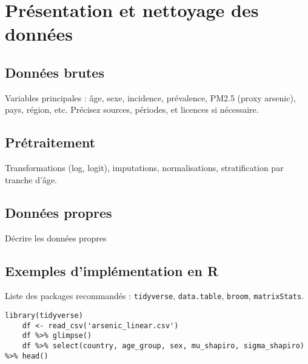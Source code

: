 \chapter{Présentation et nettoyage des données}
\label{chap:data}

\section{Données brutes}
Variables principales : âge, sexe, incidence, prévalence, PM2.5 (proxy arsenic), pays, région, etc. Précisez sources, périodes, et licences si nécessaire.


\section{Prétraitement}
Transformations (log, logit), imputations, normalisations, stratification par tranche d'âge.


\section{Données propres}
Décrire les données propres

\section{Exemples d'implémentation en R}
Liste des packages recommandés : \texttt{tidyverse}, \texttt{data.table}, \texttt{broom}, \texttt{matrixStats}.
\begin{lstlisting}[caption={Extrait : lecture et résumé de arsenic\_linear.csv}]
	library(tidyverse)
	df <- read_csv('arsenic_linear.csv')
	df %>% glimpse()
	df %>% select(country, age_group, sex, mu_shapiro, sigma_shapiro) %>% head()
\end{lstlisting}